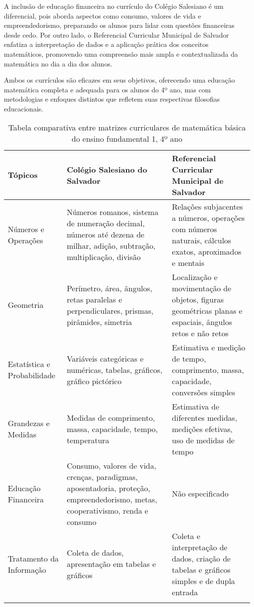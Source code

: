 A inclusão de educação financeira no currículo do Colégio Salesiano é um diferencial, pois aborda aspectos como consumo, valores de vida e empreendedorismo, preparando os alunos para lidar com questões financeiras desde cedo. Por outro lado, o Referencial Curricular Municipal de Salvador enfatiza a interpretação de dados e a aplicação prática dos conceitos matemáticos, promovendo uma compreensão mais ampla e contextualizada da matemática no dia a dia dos alunos.

Ambos os currículos são eficazes em seus objetivos, oferecendo uma educação matemática completa e adequada para os alunos do 4º ano, mas com metodologias e enfoques distintos que refletem suas respectivas filosofias educacionais.

\begin{longtable}{|p{3cm}|p{6cm}|p{6cm}|}
 
\hline
\textbf{Tópicos} & \textbf{Colégio Salesiano do Salvador} & \textbf{Referencial Curricular Municipal de Salvador} \\
\hline
Números e Operações & Números romanos, sistema de numeração decimal, números até dezena de milhar, adição, subtração, multiplicação, divisão & Relações subjacentes a números, operações com números naturais, cálculos exatos, aproximados e mentais \\
\hline
Geometria & Perímetro, área, ângulos, retas paralelas e perpendiculares, prismas, pirâmides, simetria & Localização e movimentação de objetos, figuras geométricas planas e espaciais, ângulos retos e não retos \\
\hline
Estatística e Probabilidade & Variáveis categóricas e numéricas, tabelas, gráficos, gráfico pictórico & Estimativa e medição de tempo, comprimento, massa, capacidade, conversões simples \\
\hline
Grandezas e Medidas & Medidas de comprimento, massa, capacidade, tempo, temperatura & Estimativa de diferentes medidas, medições efetivas, uso de medidas de tempo \\
\hline
Educação Financeira & Consumo, valores de vida, crenças, paradigmas, aposentadoria, proteção, empreendedorismo, metas, cooperativismo, renda e consumo & Não especificado \\
\hline
Tratamento da Informação & Coleta de dados, apresentação em tabelas e gráficos & Coleta e interpretação de dados, criação de tabelas e gráficos simples e de dupla entrada \\
\hline
\caption{Tabela comparativa entre matrizes curriculares de matemática básica do ensino fundamental 1, 4º ano}
\label{tab:comparacao_matrizes}
\end{longtable}

